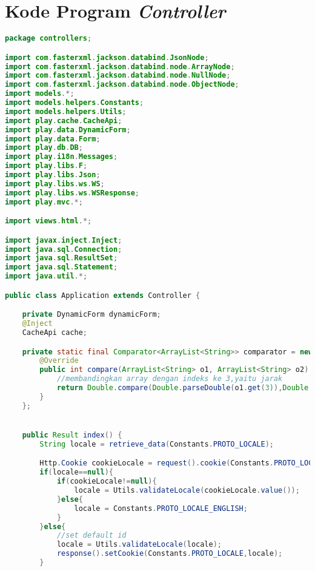 \chapter{Kode Program \textit{Controller}}
\label{app:B}

\singlespacing 
%
%
\begin{lstlisting}[language=Java,basicstyle=\tiny,caption=Application.java]
package controllers;

import com.fasterxml.jackson.databind.JsonNode;
import com.fasterxml.jackson.databind.node.ArrayNode;
import com.fasterxml.jackson.databind.node.NullNode;
import com.fasterxml.jackson.databind.node.ObjectNode;
import models.*;
import models.helpers.Constants;
import models.helpers.Utils;
import play.cache.CacheApi;
import play.data.DynamicForm;
import play.data.Form;
import play.db.DB;
import play.i18n.Messages;
import play.libs.F;
import play.libs.Json;
import play.libs.ws.WS;
import play.libs.ws.WSResponse;
import play.mvc.*;

import views.html.*;

import javax.inject.Inject;
import java.sql.Connection;
import java.sql.ResultSet;
import java.sql.Statement;
import java.util.*;

public class Application extends Controller {

    private DynamicForm dynamicForm;
    @Inject
    CacheApi cache;

    private static final Comparator<ArrayList<String>> comparator = new Comparator<ArrayList<String>>() {
        @Override
        public int compare(ArrayList<String> o1, ArrayList<String> o2) {
            //membandingkan array dengan indeks ke 3,yaitu jarak
            return Double.compare(Double.parseDouble(o1.get(3)),Double.parseDouble(o2.get(3)));
        }
    };


    public Result index() {
        String locale = retrieve_data(Constants.PROTO_LOCALE);

        Http.Cookie cookieLocale = request().cookie(Constants.PROTO_LOCALE);
        if(locale==null){
            if(cookieLocale!=null){
                locale = Utils.validateLocale(cookieLocale.value());
            }else{
                locale = Constants.PROTO_LOCALE_ENGLISH;
            }
        }else{
            //set default id
            locale = Utils.validateLocale(locale);
            response().setCookie(Constants.PROTO_LOCALE,locale);
        }


\end{lstlisting}
